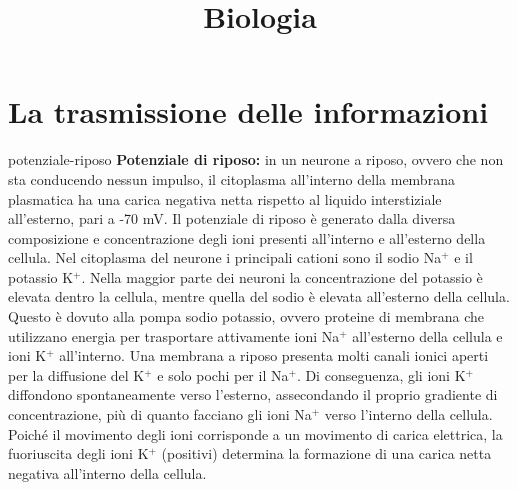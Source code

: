 \documentclass[preview]{standalone}
\begin{document}
\title{Biologia}
\genpage

\section{La trasmissione delle informazioni}


\begin{snippet}{potenziale-riposo}
    \textbf{Potenziale di riposo:} in un neurone a riposo, ovvero che non sta conducendo nessun impulso, il citoplasma
all'interno della membrana plasmatica ha una carica negativa netta rispetto al liquido
interstiziale all'esterno, pari a -70 mV. Il potenziale di riposo è generato dalla diversa
composizione e concentrazione degli ioni presenti all'interno e all'esterno della cellula. Nel
citoplasma del neurone i principali cationi sono il sodio Na\({}^+\) e il potassio K\({}^+\). Nella maggior
parte dei neuroni la concentrazione del potassio è elevata dentro la cellula, mentre quella
del sodio è elevata all'esterno della cellula. Questo è dovuto alla pompa sodio potassio,
ovvero proteine di membrana che utilizzano energia per trasportare attivamente ioni Na\({}^+\)
all'esterno della cellula e ioni K\({}^+\) all'interno. Una membrana a riposo presenta molti canali
ionici aperti per la diffusione del K\({}^+\) e solo pochi per il Na\({}^+\). Di conseguenza, gli ioni K\({}^+\)
diffondono spontaneamente verso l'esterno, assecondando il proprio gradiente di
concentrazione, più di quanto facciano gli ioni Na\({}^+\) verso l'interno della cellula. Poiché il
movimento degli ioni corrisponde a un movimento di carica elettrica, la fuoriuscita degli ioni
K\({}^+\) (positivi) determina la formazione di una carica netta negativa all'interno della cellula.
\end{snippet}

\end{document}
